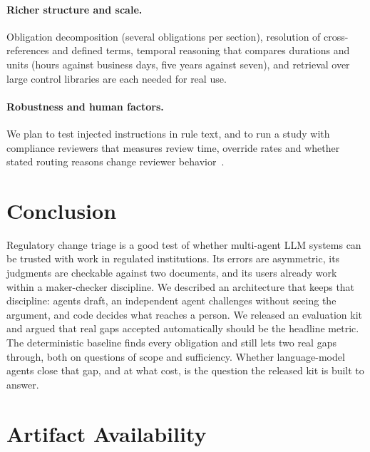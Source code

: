 \documentclass[sigconf,review,anonymous]{acmart}
\begin{document}
\paragraph{Richer structure and scale.}
Obligation decomposition (several obligations per section), resolution of
cross-references and defined terms, temporal reasoning that compares
durations and units (hours against business days, five years against seven),
and retrieval over large control libraries are each needed for real use.

\paragraph{Robustness and human factors.}
We plan to test injected instructions in rule text, and to run a study with
compliance reviewers that measures review time, override rates and whether
stated routing reasons change reviewer behavior~\cite{amershi2019guidelines}.

\section{Conclusion}
\label{sec:conclusion}

Regulatory change triage is a good test of whether multi-agent LLM systems
can be trusted with work in regulated institutions. Its errors are
asymmetric, its judgments are checkable against two documents, and its
users already work within a maker-checker discipline. We described an
architecture that keeps that discipline: agents draft, an independent agent
challenges without seeing the argument, and code decides what reaches a
person. We released an evaluation kit and argued that real gaps accepted
automatically should be the headline metric. The deterministic baseline
finds every obligation and still lets two real gaps through, both on
questions of scope and sufficiency. Whether language-model agents close that
gap, and at what cost, is the question the released kit is built to answer.

\section*{Artifact Availability}
\end{document}
